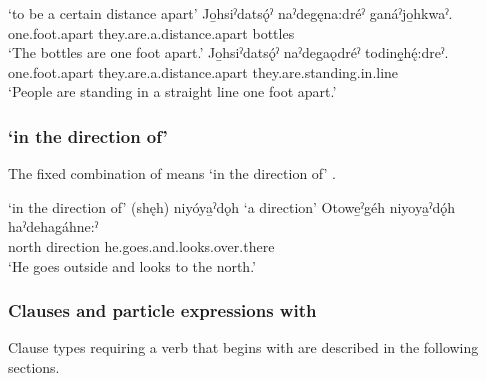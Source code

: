 \ea\label{ex:pppexpressionex7}  ‘to be a certain distance apart’
\ea
\gll Jo̱hsiˀdatsǫ́ˀ naˀdegęna:dréˀ ganáˀjo̱hkwaˀ.  \\
one.foot.apart they.are.a.distance.apart bottles \\
\glt ‘The bottles are one foot apart.’
\ex
\gll Jo̱hsiˀdatsǫ́ˀ naˀdegaǫdréˀ todinę̱hę́:dreˀ. \\
one.foot.apart they.are.a.distance.apart they.are.standing.in.line \\
\glt ‘People are standing in a straight line one foot apart.’
\z
\z

\subsubsection*{ ‘in the direction of’} \label{[ni-yo-yaˀdǫh] ‘in the direction of’}
The fixed combination of  means ‘in the direction of’ .

\ea\label{ex:pppexpressionex9}  ‘in the direction of’
\ea (shęh) niyóya̱ˀdǫh ‘a direction’ 
\ex
\gll Otowe̱ˀgéh niyoya̱ˀdǫ́h haˀdehagáhne:ˀ \\
north direction he.goes.and.looks.over.there \\
\glt ‘He goes outside and looks to the north.’ 
\z
\z

\subsubsection*{Clauses and particle expressions with  \textsc{\partitive}} \label{Particle expressions with [ni-] (partitive)}
Clause types requiring a verb that begins with  {\partitive} are described in the following sections.

